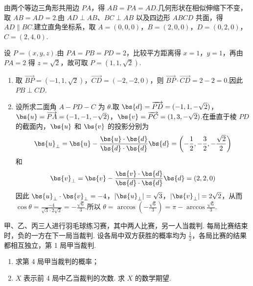 \begin{solution}
由两个等边三角形共用边 \(PA\)，得 \(AB=PA=AD\).几何形状在相似伸缩下不变，取 \(AB=AD=2\).由 \(AD\perp AB\)、\(BC\perp AB\) 以及四边形 \(ABCD\) 共面，得 \(AD\parallel BC\).建立直角坐标系，取 \(A=(0,0,0)\)，\(B=(2,0,0)\)，\(D=(0,2,0)\)，\(C=(2,4,0)\).

设 \(P=(x,y,z)\).由 \(PA=PB=PD=2\)，比较平方距离得 \(x=1\)，\(y=1\)，再由 \(PA=2\) 得 \(z=\sqrt2\)，故可取 \(P=(1,1,\sqrt2)\).

\begin{enumerate}
\item 取 \(\overrightarrow{BP}=(-1,1,\sqrt2)\)，\(\overrightarrow{CD}=(-2,-2,0)\)，则 \(\overrightarrow{BP}\cdot\overrightarrow{CD}=2-2=0\).因此 \(PB\perp CD\).
\item 设所求二面角 \(A-PD-C\) 为 \(\theta\).取 \(\bs{d}=\overrightarrow{PD}=(-1,1,-\sqrt2)\)，\(\bs{u}=\overrightarrow{PA}=(-1,-1,-\sqrt2)\)，\(\bs{v}=\overrightarrow{PC}=(1,3,-\sqrt2)\).在垂直于棱 \(PD\) 的截面内，\(\bs{u}\) 和 \(\bs{v}\) 的投影分别为
\[
\bs{u}_{\perp}=\bs{u}-\frac{\bs{u}\cdot\bs{d}}{\bs{d}\cdot\bs{d}}\bs{d}=\left(-\frac12,-\frac32,-\frac{\sqrt2}{2}\right)
\]
和
\[
\bs{v}_{\perp}=\bs{v}-\frac{\bs{v}\cdot\bs{d}}{\bs{d}\cdot\bs{d}}\bs{d}=(2,2,0)
\]
因此 \(\bs{u}_{\perp}\cdot\bs{v}_{\perp}=-4\)，\(|\bs{u}_{\perp}|=\sqrt3\)，\(|\bs{v}_{\perp}|=2\sqrt2\)，从而 \(\cos\theta=\frac{-4}{\sqrt3\cdot2\sqrt2}=-\frac{\sqrt6}{3}\).所以 \(\theta=\arccos\left(-\frac{\sqrt6}{3}\right)=\pi-\arccos\frac{\sqrt6}{3}\).
\end{enumerate}
\end{solution}

\begin{problem}
甲、乙、丙三人进行羽毛球练习赛，其中两人比赛，另一人当裁判. 每局比赛结束时，负的一方在下一局当裁判. 设各局中双方获胜的概率均为 \(\frac{1}{2}\)，各局比赛的结果都相互独立，第 1 局甲当裁判.

\begin{enumerate}
\item 求第 4 局甲当裁判的概率；
\item \(X\) 表示前 4 局中乙当裁判的次数. 求 \(X\) 的数学期望.
\end{enumerate}
\end{problem}

